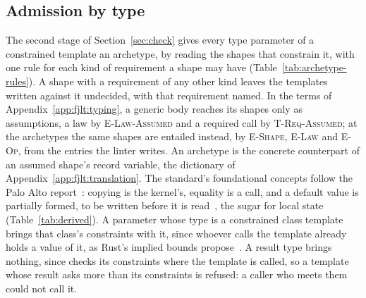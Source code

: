 \subsection{Admission by type}
\label{app:lint:admit}

The second stage of Section~\ref{sec:check} gives every type parameter of a constrained template an archetype, by reading the shapes that constrain it, with one rule for each kind of requirement a shape may have (Table~\ref{tab:archetype-rules}).
A shape with a requirement of any other kind leaves the templates written against it undecided, with that requirement named.
In the terms of Appendix~\ref{app:fjlt:typing}, a generic body reaches its shapes only as assumptions, a law by \textsc{E-Law-Assumed} and a required call by \textsc{T-Req-Assumed}; at the archetypes the same shapes are entailed instead, by \textsc{E-Shape}, \textsc{E-Law} and \textsc{E-Op}, from the entries the linter writes.
An archetype is the concrete counterpart of an assumed shape's record variable, the dictionary of Appendix~\ref{app:fjlt:translation}.
The standard's foundational concepts follow the Palo Alto report~\cite[\S 3.3]{stroustrup2012concept}: copying is the kernel's, equality is a call, and a default value is partially formed, to be written before it is read~\cite[\S 1.5]{stepanov2009elements}, the sugar for local state (Table~\ref{tab:derived}).
A parameter whose type is a constrained class template brings that class's constraints with it, since whoever calls the template already holds a value of it, as Rust's implied bounds propose~\cite{rust2017impliedbounds}.
A result type brings nothing, since \Cpp{} checks its constraints where the template is called, so a template whose result asks more than its constraints is refused: a caller who meets them could not call it.

